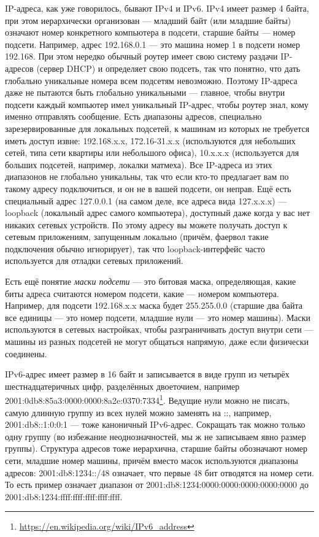 \documentclass[a5paper]{article}
\begin{document}
IP-адреса, как уже говорилось, бывают IPv4 и IPv6. IPv4 имеет размер 4 байта, при этом иерархически организован --- младший байт (или младшие байты) означают номер конкретного компьютера в подсети, старшие байты --- номер подсети. Например, адрес 192.168.0.1 --- это машина номер 1 в подсети номер 192.168. При этом нередко обычный роутер имеет свою систему раздачи IP-адресов (сервер DHCP) и определяет свою подсеть, так что понятно, что дать глобально уникальные номера всем подсетям невозможно. Поэтому IP-адреса даже не пытаются быть глобально уникальными --- главное, чтобы внутри подсети каждый компьютер имел уникальный IP-адрес, чтобы роутер знал, кому именно отправлять сообщение. Есть диапазоны адресов, специально зарезервированные для локальных подсетей, к машинам из которых не требуется иметь доступ извне: 192.168.x.x, 172.16-31.x.x (используются для небольших сетей, типа сети квартиры или небольшого офиса), 10.x.x.x (используется для больших подсетей, например, локалки матмеха). Все IP-адреса из этих диапазонов не глобально уникальны, так что если кто-то предлагает вам по такому адресу подключиться, и он не в вашей подсети, он неправ. Ещё есть специальный адрес 127.0.0.1 (на самом деле, все адреса вида 127.x.x.x) ---  loopback (локальный адрес самого компьютера), доступный даже когда у вас нет никаких сетевых устройств. По этому адресу вы можете получать доступ к сетевым приложениям, запущенным локально (причём, фаервол такие подключения обычно игнорирует), так что loopback-интерфейс часто используется для отладки сетевых приложений. 

Есть ещё понятие \textit{маски подсети} --- это битовая маска, определяющая, какие биты адреса считаются номером подсети, какие --- номером компьютера. Например, для подсети 192.168.x.x маска будет 255.255.0.0 (старшие два байта все единицы --- это номер подсети, младшие нули --- это номер машины). Маски используются в сетевых настройках, чтобы разграничивать доступ внутри сети --- машины из разных подсетей не могут общаться напрямую, даже если физически соединены.

IPv6-адрес имеет размер в 16 байт и записывается в виде групп из четырёх шестнадцатеричных цифр, разделённых двоеточием, например 2001:0db8:85a3:0000:0000:8a2e:0370:7334\footnote{\url{https://en.wikipedia.org/wiki/IPv6_address}}. Ведущие нули можно не писать, самую длинную группу из всех нулей можно заменять на ::, например, 2001:db8::1:0:0:1 --- тоже каноничный IPv6-адрес. Сокращать так можно только одну группу (во избежание неоднозначностей, мы ж не записываем явно размер группы). Структура адресов тоже иерархична, старшие байты обозначают номер сети, младшие номер машины, причём вместо масок используются диапазоны адресов: 2001:db8:1234::/48 означает, что первые 48 бит отводятся на номер сети. То есть пример означает диапазон от 2001:db8:1234:0000:0000:0000:0000:0000 до 2001:db8:1234:ffff:ffff:ffff:ffff:ffff.
\end{document}
